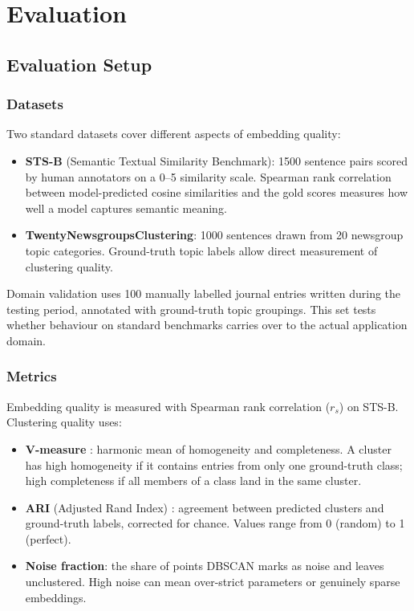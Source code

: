 \chapter{Evaluation}
\label{chap:evaluation}

\section{Evaluation Setup}

\subsection{Datasets}

Two standard datasets cover different aspects of embedding quality:

\begin{itemize}
  \item \textbf{STS-B} \cite{cer2017semeval} (Semantic Textual Similarity Benchmark): 1500 sentence pairs scored by human annotators on a 0--5 similarity scale. Spearman rank correlation between model-predicted cosine similarities and the gold scores measures how well a model captures semantic meaning.
  \item \textbf{TwentyNewsgroupsClustering}: 1000 sentences drawn from 20 newsgroup topic categories. Ground-truth topic labels allow direct measurement of clustering quality.
\end{itemize}

Domain validation uses 100 manually labelled journal entries written during the testing period, annotated with ground-truth topic groupings. This set tests whether behaviour on standard benchmarks carries over to the actual application domain.

\subsection{Metrics}

Embedding quality is measured with Spearman rank correlation ($r_s$) on STS-B. Clustering quality uses:

\begin{itemize}
  \item \textbf{V-measure} \cite{rosenberg2007vmeasure}: harmonic mean of homogeneity and completeness. A cluster has high homogeneity if it contains entries from only one ground-truth class; high completeness if all members of a class land in the same cluster.
  \item \textbf{ARI} (Adjusted Rand Index) \cite{hubert1985comparing}: agreement between predicted clusters and ground-truth labels, corrected for chance. Values range from 0 (random) to 1 (perfect).
  \item \textbf{Noise fraction}: the share of points DBSCAN marks as noise and leaves unclustered. High noise can mean over-strict parameters or genuinely sparse embeddings.
\end{itemize}

